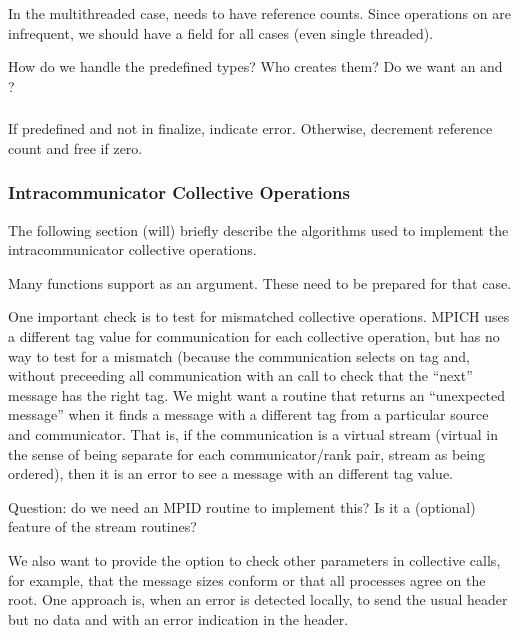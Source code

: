 \documentclass{article}
\begin{document}
In the multithreaded case,  needs to have reference counts.
Since operations on  are infrequent, we should have a
 field for all cases (even single threaded).

How do we handle the predefined types?  Who creates them?  Do we want an 
 and ?

\subsubsection{}
If predefined and not in finalize, indicate error.
Otherwise, decrement reference count and free if zero.


\subsubsection{Intracommunicator Collective Operations}
The following section (will) briefly describe the algorithms used to implement
the intracommunicator collective operations.

Many functions support  as an argument.  These need to
be prepared for that case.

One important check is to test for mismatched collective operations.
MPICH uses a different tag value for communication for each collective
operation, but has no way to test for a mismatch (because the
communication selects on tag and, without preceeding all communication
with an  call to check that the ``next'' message
has the right tag.  We might want a routine that returns an
``unexpected message'' when it finds a message with a different tag
from a particular source and communicator.
That is, if the communication is a virtual stream (virtual in the
sense of being separate for each communicator/rank pair, stream as
being ordered), then it is
an error to see a message with an different tag value.  

Question: do we need an MPID routine to implement this? Is it a
(optional) feature of the stream routines?

We also want to provide the option to check other parameters in
collective calls, for example, that the message sizes conform or that
all processes agree on the root.  One approach is, when an error is
detected locally, to send the usual header but no data and with an
error indication in the header.
\end{document}
